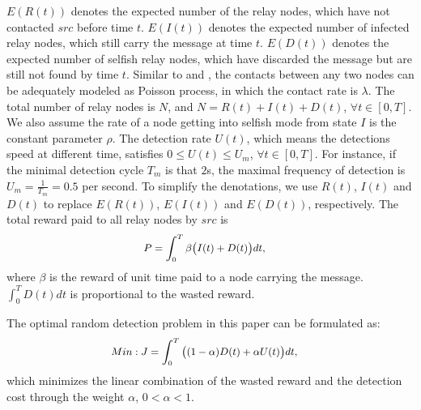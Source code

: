 $E(R(t))$ denotes the expected number of the relay nodes,
which have not contacted $src$ before time $t$.
$E(I(t))$ denotes the expected number of infected relay nodes,
which still carry the message at time $t$.
$E(D(t))$ denotes the expected number of selfish relay nodes,
which have discarded the message 
but are still not found by time $t$.
Similar to \cite{DBLP:journals/tcss/WuDH18} and \cite{CC2007PerfAnaly},
the contacts between any two nodes
can be adequately modeled as Poisson process,
in which the contact rate is $\lambda$.
The total number of relay nodes is $N$,
and $N=R(t)+I(t)+D(t)$, $\forall t \in [0, T]$.
We also assume the rate of a node getting into selfish mode
from state $I$
is the constant parameter $\rho$.
The detection rate $U(t)$,
which means the detections speed at different time,
satisfies $0 \le U(t) \le U_{m}$, $\forall t \in [0, T]$.
For instance, if the minimal detection cycle
$T_{m}$ is that $2$s,
the maximal frequency of detection is
$U_{m} = \frac{1}{T_{m}} = 0.5$ per second.
To simplify the denotations,
we use $R(t)$, $I(t)$ and $D(t)$ to
replace $E(R(t))$, $E(I(t))$ and $E(D(t))$,
respectively.
The total reward paid to all relay nodes by $src$ is
\begin{equation}
\begin{small}
\label{eq:reward}
\begin{aligned}
P &= \int_{0}^{T} \beta \big( I(t) + D(t) \big)dt,
\end{aligned}
\end{small}
\end{equation}
where $\beta$ is the reward of unit time
paid to a node carrying the message.
$\int_{0}^{T} D(t) dt$ is proportional to the wasted reward.

The optimal random detection problem
in this paper can be formulated as:
\begin{equation}
\begin{small}
\label{eq:obj}
\begin{aligned}
Min: J &= \int_{0}^{T} \big( (1-\alpha) D(t) + \alpha U(t) \big) dt,
\end{aligned}
\end{small}
\end{equation}
which minimizes the linear combination of
the wasted reward and the detection cost through the weight $\alpha$,
$0 < \alpha < 1$.

